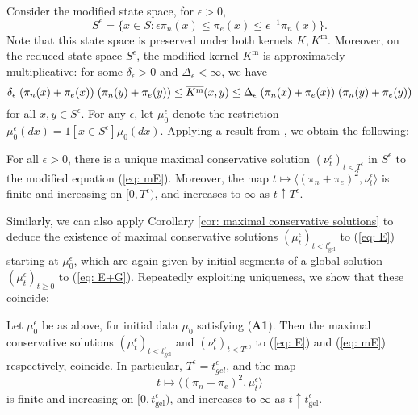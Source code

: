 Consider the modified state space, for $\epsilon>0$, \begin{equation*}
    S^\epsilon= \{x\in S: \epsilon \pi_n(x) \leq \pi_e(x) \leq \epsilon^{-1} \pi_n(x)\}.
\end{equation*} Note that this state space is preserved under both kernels $K, K^\text{m}$. Moreover, on the reduced state space $S^\epsilon$, the modified kernel $K^\text{m}$ is approximately multiplicative: for some $\delta_\epsilon>0$ and $\Delta_\epsilon<\infty$, we have \begin{equation*}
    \delta_\epsilon\hspace{0.1cm} (\pi_n(x)+\pi_e(x))\hspace{0.1cm}(\pi_n(y)+\pi_e(y)) \leq \overline{K^\text{m}}(x,y) \leq  \Delta_\epsilon\hspace{0.1cm} (\pi_n(x)+\pi_e(x))\hspace{0.1cm}(\pi_n(y)+\pi_e(y))
\end{equation*}for all $x,y \in S^\epsilon$. For any $\epsilon$, let $\mu_0^\epsilon$ denote the restriction $\mu_0^\epsilon(dx)=1[x\in S^\epsilon]\mu_0(dx).$ Applying a result from  \cite{N00}, we obtain the following:
\begin{lemma}\label{lemma: solution to modified equation}
    For all $\epsilon>0$, there is a unique maximal conservative solution  $(\nu^\epsilon_t)_{t< T^\epsilon}$ in $S^\epsilon$ to the modified equation (\ref{eq: mE}). Moreover, the map $t\mapsto \langle (\pi_n+\pi_e)^2, \nu^\epsilon_t\rangle$ is finite and increasing on $[0,T^\epsilon)$, and increases to $\infty$ as $t\uparrow T^\epsilon$. 
\end{lemma}

Similarly, we can also apply Corollary \ref{cor: maximal conservative solutions} to deduce the existence of maximal conservative solutions $(\mu^\epsilon_t)_{t<t_\mathrm{gel}^\epsilon}$ to (\ref{eq: E}) starting at $\mu^\epsilon_0$, which are again given by initial segments of a global solution $(\mu^\epsilon_t)_{t\geq 0}$ to (\ref{eq: E+G}). Repeatedly exploiting uniqueness, we show that these coincide:

\begin{lemma} Let $\mu^\epsilon_0$ be as above, for initial data $\mu_0$ satisfying (\textbf{A1}).  Then the maximal conservative solutions $(\mu^\epsilon_t)_{t<t_\mathrm{gel}^\epsilon}$ and $(\nu^\epsilon_t)_{t<T^\epsilon}$, to (\ref{eq: E}) and (\ref{eq: mE}) respectively, coincide. In particular, $T^\epsilon = t^\epsilon_{gel}$, and the map \begin{equation*}
    t\mapsto \langle (\pi_n+\pi_e)^2, \mu^\epsilon_t\rangle
\end{equation*} is finite and increasing on $[0, t_\mathrm{gel}^\epsilon)$, and increases to $\infty$ as $t\uparrow t_\mathrm{gel}^\epsilon.$ \end{lemma}

